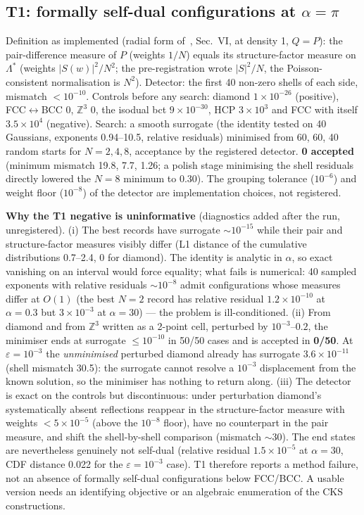 \subsection{T1: formally self-dual configurations at $\alpha=\pi$}
Definition as implemented (radial form of~\cite{CKS09}, Sec.~VI, at density 1, $Q=P$): the pair-difference measure of $P$ (weights
$1/N$) equals its structure-factor measure on $\Lambda^*$ (weights $|S(w)|^2/N^2$; the pre-registration wrote $|S|^2/N$, the
Poisson-consistent normalisation is $N^2$). Detector: the first 40 non-zero shells of each side, mismatch $<10^{-10}$. Controls
before any search: diamond $1\times10^{-26}$ (positive), FCC$\leftrightarrow$BCC $0$, $\mathbb Z^3$ $0$, the isodual bct
$9\times10^{-30}$, HCP $3\times10^3$ and FCC with itself $3.5\times10^4$ (negative). Search: a smooth surrogate (the identity tested
on 40 Gaussians, exponents 0.94--10.5, relative residuals) minimised from 60, 60, 40 random starts for $N=2,4,8$, acceptance by
the registered detector. \textbf{0 accepted} (minimum mismatch 19.8, 7.7, 1.26; a polish stage minimising the shell residuals directly lowered
the $N=8$ minimum to 0.30). The grouping tolerance ($10^{-6}$) and weight floor ($10^{-8}$) of the detector are implementation
choices, not registered.

\begin{failbox}
\textbf{Why the T1 negative is uninformative} (diagnostics added after the run, unregistered). (i) The best records have surrogate
$\sim10^{-15}$ while their pair and structure-factor measures visibly differ (L1 distance of the cumulative distributions 0.7--2.4,
0 for diamond). The identity is analytic in $\alpha$, so exact vanishing on an interval would force equality; what fails is
numerical: 40 sampled exponents with relative residuals $\sim10^{-8}$ admit configurations whose measures differ at $O(1)$ (the
best $N=2$ record has relative residual $1.2\times10^{-10}$ at $\alpha=0.3$ but $3\times10^{-3}$ at $\alpha=30$) --- the
problem is ill-conditioned. (ii) From diamond and from $\mathbb Z^3$ written as a 2-point cell, perturbed by $10^{-3}$--$0.2$, the
minimiser ends at surrogate $\le10^{-10}$ in 50/50 cases and is accepted in \textbf{0/50}. At $\varepsilon=10^{-3}$ the
\emph{unminimised} perturbed diamond already has surrogate $3.6\times10^{-11}$ (shell mismatch 30.5): the surrogate cannot resolve a
$10^{-3}$ displacement from the known solution, so the minimiser has nothing to return along. (iii) The detector is exact on the
controls but discontinuous: under perturbation diamond's systematically absent reflections reappear in the structure-factor
measure with weights $<5\times10^{-5}$ (above the $10^{-8}$ floor), have no counterpart in the pair measure, and shift the
shell-by-shell comparison (mismatch $\sim30$). The end states are nevertheless genuinely not self-dual (relative residual
$1.5\times10^{-5}$ at $\alpha=30$, CDF distance 0.022 for the $\varepsilon=10^{-3}$ case). T1 therefore reports a method
failure, not an absence of formally self-dual configurations below FCC/BCC. A usable version needs an identifying objective or an
algebraic enumeration of the CKS constructions.
\end{failbox}

